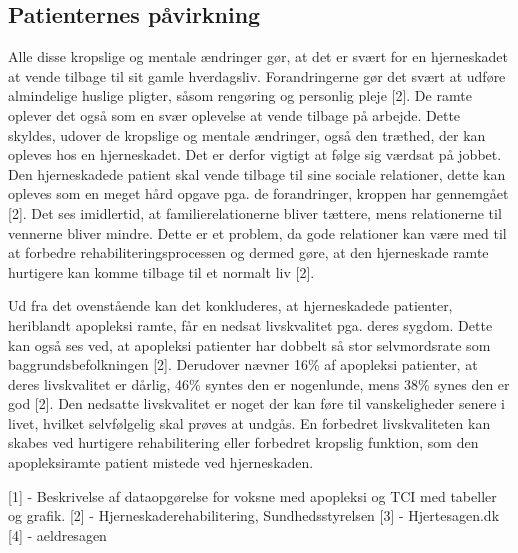 \subsection{Patienternes påvirkning}
Alle disse kropslige og mentale ændringer gør, at det er svært for en hjerneskadet at vende tilbage til sit gamle hverdagsliv. Forandringerne gør det svært at udføre almindelige huslige pligter, såsom rengøring og personlig pleje [2]. De ramte oplever det også som en svær oplevelse at vende tilbage på arbejde. Dette skyldes, udover de kropslige og mentale ændringer, også den træthed, der kan opleves hos en hjerneskadet. Det er derfor vigtigt at følge sig værdsat på jobbet. Den hjerneskadede patient skal vende tilbage til sine sociale relationer,  dette kan opleves som en meget hård opgave pga. de forandringer, kroppen har gennemgået [2]. Det ses imidlertid, at familierelationerne bliver tættere, mens relationerne til vennerne bliver mindre. Dette er et problem, da gode relationer kan være med til at forbedre rehabiliteringsprocessen og dermed gøre, at den hjerneskade ramte hurtigere kan komme tilbage til et normalt liv [2].

Ud fra  det ovenstående kan det konkluderes, at hjerneskadede patienter, heriblandt apopleksi ramte, får en nedsat livskvalitet pga. deres sygdom. Dette kan også ses ved, at apopleksi patienter har dobbelt så stor selvmordsrate som baggrundsbefolkningen [2]. Derudover nævner 16\% af apopleksi patienter, at deres livskvalitet er dårlig, 46\% syntes den er nogenlunde, mens 38\% synes den er god [2]. Den nedsatte livskvalitet er noget der kan føre til vanskeligheder senere i livet, hvilket selvfølgelig skal prøves at undgås. En forbedret livskvaliteten kan skabes ved hurtigere rehabilitering eller forbedret kropslig funktion, som den apopleksiramte patient mistede ved hjerneskaden.  


[1] - Beskrivelse af dataopgørelse for voksne med apopleksi og TCI med tabeller og grafik. 
[2] - Hjerneskaderehabilitering, Sundhedsstyrelsen
[3] - Hjertesagen.dk
[4] - aeldresagen

